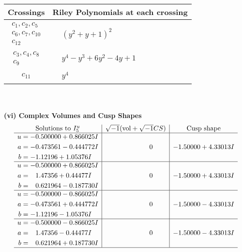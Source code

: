 \documentclass[1p]{elsarticle_modified}
\theoremstyle{definition}
\newcommand{\I}{\sqrt{-1}}
\begin{document}
\begin{tabular}{m{50pt}|m{274pt}}
Crossings & \hspace{64pt}Riley Polynomials at each crossing \\
\hline $$\begin{aligned}c_{1},c_{2},c_{5}\\c_{6},c_{7},c_{10}\\c_{12}\end{aligned}$$&$\begin{aligned}
&(y^2+y+1)^2
\end{aligned}$\\
\hline $$\begin{aligned}c_{3},c_{4},c_{8}\\c_{9}\end{aligned}$$&$\begin{aligned}
&y^4- y^3+6 y^2-4 y+1
\end{aligned}$\\
\hline $$\begin{aligned}c_{11}\end{aligned}$$&$\begin{aligned}
&y^4
\end{aligned}$\\
\hline
\end{tabular}\\~\\
\newpage\flushleft \textbf{(vi) Complex Volumes and Cusp Shapes}
$$\begin{array}{c|c|c}  
\text{Solutions to }I^u_{5}& \I (\text{vol} + \sqrt{-1}CS) & \text{Cusp shape}\\
 \hline 
\begin{aligned}
u &= -0.500000 + 0.866025 I \\
a &= -0.473561 - 0.444772 I \\
b &= -1.12196 + 1.05376 I\end{aligned}
 & \phantom{-0.000000 } 0 & -1.50000 + 4.33013 I \\ \hline\begin{aligned}
u &= -0.500000 + 0.866025 I \\
a &= \phantom{-}1.47356 + 0.44477 I \\
b &= \phantom{-}0.621964 - 0.187730 I\end{aligned}
 & \phantom{-0.000000 } 0 & -1.50000 + 4.33013 I \\ \hline\begin{aligned}
u &= -0.500000 - 0.866025 I \\
a &= -0.473561 + 0.444772 I \\
b &= -1.12196 - 1.05376 I\end{aligned}
 & \phantom{-0.000000 } 0 & -1.50000 - 4.33013 I \\ \hline\begin{aligned}
u &= -0.500000 - 0.866025 I \\
a &= \phantom{-}1.47356 - 0.44477 I \\
b &= \phantom{-}0.621964 + 0.187730 I\end{aligned}
 & \phantom{-0.000000 } 0 & -1.50000 - 4.33013 I\\
 \hline 
 \end{array}$$\newpage
\end{document}
